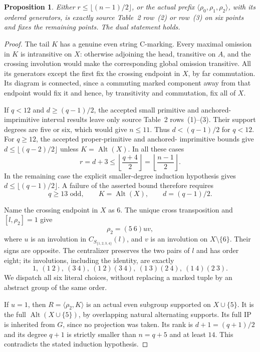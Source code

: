 \documentclass[11pt,a4paper]{article}
\newtheorem{proposition}{Proposition}
\newcommand{\gen}[1]{\langle#1\rangle}
\newcommand{\Alt}{\operatorname{Alt}}
\begin{document}
\begin{proposition}
Either $r\leq\lfloor(n-1)/2\rfloor$, or the actual prefix
$\gen{\rho_0,\rho_1,\rho_2}$, with its ordered generators,
is exactly source Table~2 row~(2) or row~(3) on six points
and fixes the remaining points. The dual statement holds.
\end{proposition}
\begin{proof}
The tail $K$ has a genuine even string C-marking. Every
maximal omission in $K$ is intransitive on $X$: otherwise
adjoining the head, transitive on $A$, and the crossing
involution would make the corresponding global omission
transitive. All its generators except the first fix the
crossing endpoint in $X$, by far commutation. Its diagram is
connected, since a commuting marked component away from
that endpoint would fix it and hence, by transitivity and
commutation, fix all of $X$.

If $q<12$ and $d\geq(q-1)/2$, the accepted small primitive
and anchored-imprimitive interval results leave only source
Table~2 rows~(1)--(3). Their support degrees are five or six,
which would give $n\leq11$. Thus $d<(q-1)/2$ for $q<12$.
For $q\geq12$, the accepted proper-primitive and anchored-
imprimitive bounds give $d\leq\lfloor(q-2)/2\rfloor$
unless $K=\Alt(X)$. In all these cases
\[
       r=d+3\leq\left\lfloor\frac{q+4}{2}\right\rfloor
                  =\left\lfloor\frac{n-1}{2}\right\rfloor.
\]
In the remaining case the explicit smaller-degree induction
hypothesis gives $d\leq\lfloor(q-1)/2\rfloor$.
A failure of the asserted bound therefore requires
\[
 q\geq13\text{ odd},\qquad K=\Alt(X),\qquad
 d=(q-1)/2.
\]

Name the crossing endpoint in $X$ as $6$. The unique cross
transposition and $[l,\rho_2]=1$ give
\[
             \rho_2=(5\ 6)u v,
\]
where $u$ is an involution in $C_{S_{\{1,2,3,4\}}}(l)$,
and $v$ is an involution on $X\setminus\{6\}$.
Their signs are opposite. The centralizer preserves the two
pairs of $l$ and has order eight; its involutions, including
the identity, are exactly
\[
 1,\ (1\ 2),\ (3\ 4),\ (1\ 2)(3\ 4),\
 (1\ 3)(2\ 4),\ (1\ 4)(2\ 3).
\]
We dispatch all six literal choices, without replacing a
marked tuple by an abstract group of the same order.

If $u=1$, then $R=\gen{\rho_2,K}$ is an actual even
subgroup supported on $X\cup\{5\}$. It is the full
$\Alt(X\cup\{5\})$, by overlapping natural alternating
supports. Its full IP is inherited from $G$, since no
projection was taken. Its rank is $d+1=(q+1)/2$ and its
degree $q+1$ is strictly smaller than $n=q+5$ and at least
$14$. This contradicts the stated induction hypothesis.


\end{proof}
\end{document}
